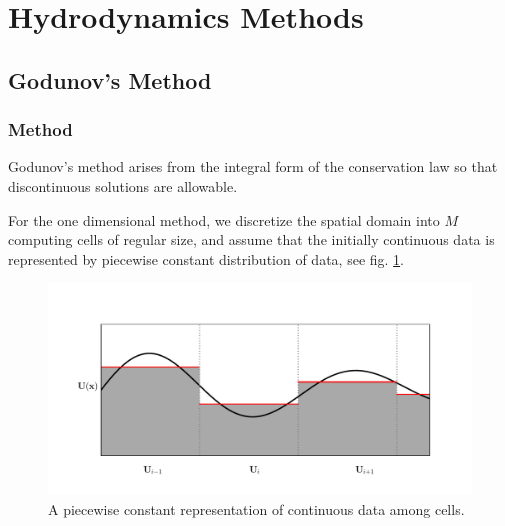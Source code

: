 \newpage

\section{Hydrodynamics Methods}


\subsection{Godunov's Method}










\subsubsection{Method}

Godunov's method arises from the integral form of the conservation law so that discontinuous solutions are allowable.

For the one dimensional method, we discretize the spatial domain into $M$ computing cells of regular size, and assume that the initially continuous data is represented by piecewise constant distribution of data, see fig. \ref{fig:piecewise-constant}.



\begin{figure}[H]
	\includegraphics[width=\textwidth]{./figures/piecewise_const.pdf}%
	\caption{	
		A piecewise constant representation of continuous data among cells.
		\label{fig:piecewise-constant}
		}
\end{figure}

